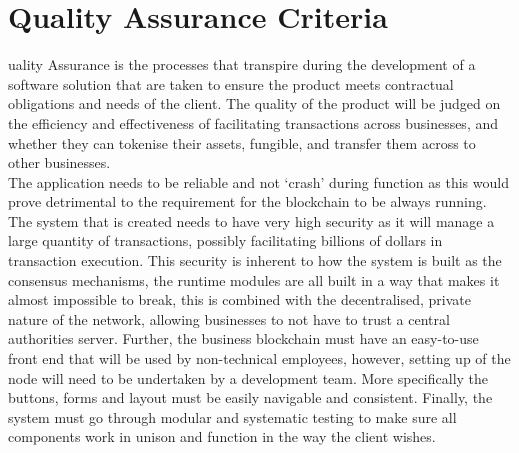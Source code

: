 \let\textcircled=\pgftextcircled
\chapter{Quality Assurance Criteria}

uality Assurance is the processes that transpire during the development of a software solution that are taken to ensure the product meets contractual obligations and needs of the client.  The quality of the product will be judged on the efficiency and effectiveness of facilitating transactions across businesses, and whether they can tokenise their assets, fungible, and transfer them across to other businesses. \\

The application needs to be reliable and not ‘crash’ during function as this would prove detrimental to the requirement for the blockchain to be always running. The system that is created needs to have very high security as it will manage a large quantity of transactions, possibly facilitating billions of dollars in transaction execution. This security is inherent to how the system is built as the consensus mechanisms, the runtime modules are all built in a way that makes it almost impossible to break, this is combined with the decentralised, private nature of the network, allowing businesses to not have to trust a central authorities server.  Further, the business blockchain must have an easy-to-use front end that will be used by non-technical employees, however, setting up of the node will need to be undertaken by a development team. More specifically the buttons, forms and layout must be easily navigable and consistent. Finally, the system must go through modular and systematic testing to make sure all components work in unison and function in the way the client wishes. 

